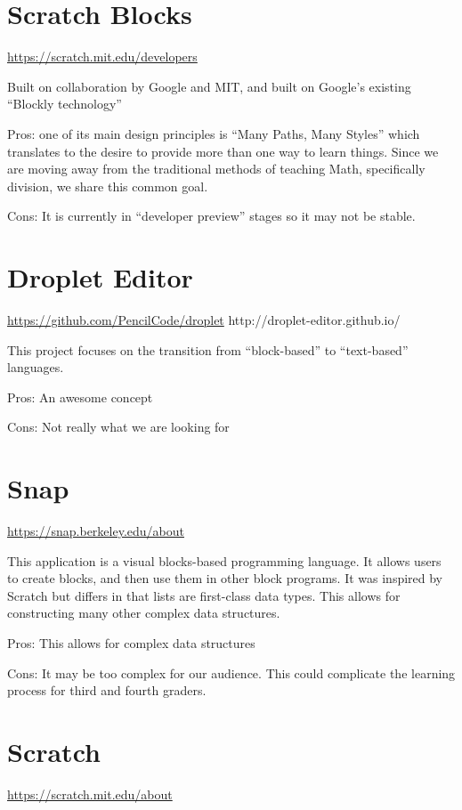 \section{Scratch Blocks}
\url{https://scratch.mit.edu/developers}

Built on collaboration by Google and MIT, and built on Google’s existing “Blockly technology” 

Pros: one of its main design principles is “Many Paths, Many Styles” which translates to the desire to provide more than one way to learn things. Since we are moving away from the traditional methods of teaching Math, specifically division, we share this common goal.

Cons: It is currently in “developer preview” stages so it may not be stable.



\section{Droplet Editor}
\url{https://github.com/PencilCode/droplet}
http://droplet-editor.github.io/

This project focuses on the transition from “block-based” to “text-based” languages. 

Pros: An awesome concept

Cons: Not really what we are looking for



\section{Snap}
\url{https://snap.berkeley.edu/about}

This application is a visual blocks-based programming language. It allows users to create blocks, and then use them in other block programs. It was inspired by Scratch but differs in that lists are first-class data types. This allows for constructing many other complex data structures.

Pros: This allows for complex data structures

Cons: It may be too complex for our audience. This could complicate the learning process for third and fourth graders.



\section{Scratch}
\url{https://scratch.mit.edu/about}

